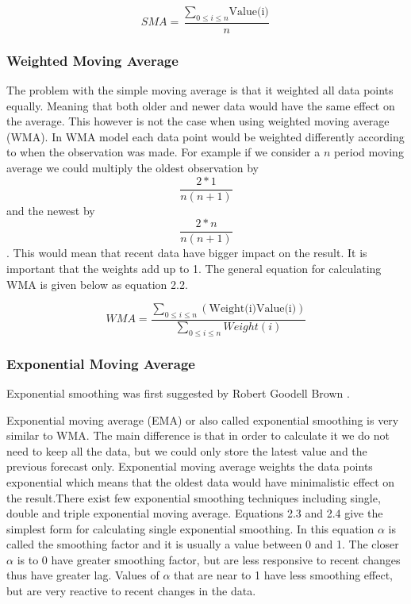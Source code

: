 \begin{equation}\label{sma}
	SMA = \frac{\sum_{0\le i\le n}\textrm{Value(i)}}{n}
\end{equation}

\subsubsection{Weighted Moving Average}
The problem with the simple moving average is that it weighted all data points equally. Meaning that both older and newer data would have the same effect on the average. This however is not the case when using weighted moving average (WMA). In WMA model each data point would be weighted differently according to when the observation was made. For example if we consider a $n$ period moving average we could multiply the oldest observation by \[\frac{2*1}{n(n+1)}\] and the newest by \[\frac{2*n}{n(n+1)}\]. This would mean that recent data have bigger impact on the result. It is important that the weights add up to 1. The general equation for calculating WMA is given below as equation 2.2.

\begin{equation}\label{wma}
WMA = \frac{\sum_{0\le i\le n}(\textrm{Weight(i)}\textrm{Value(i)})}{\sum_{0\le i\le n}Weight(i)}
\end{equation}

\subsubsection{Exponential Moving Average}
Exponential smoothing was first suggested by Robert Goodell Brown \cite{FOR3980040103}. 

Exponential moving average (EMA) or also called exponential smoothing is very similar to WMA. The main difference is that in order to calculate it we do not need to keep all the data, but we could only store the latest value and the previous forecast only. Exponential moving average weights the data points exponential which means that the oldest data would have minimalistic effect on the result.There exist few exponential smoothing techniques including single, double and triple exponential moving average. Equations 2.3 and 2.4 give the simplest form for calculating single exponential smoothing. In this equation $\alpha$ is called the smoothing factor and it is usually a value between 0 and 1. The closer $\alpha$ is to 0 have greater smoothing factor, but are less responsive to recent changes thus have greater lag. Values of $\alpha$ that are near to 1 have less smoothing effect, but are very reactive to recent changes in the data. 

